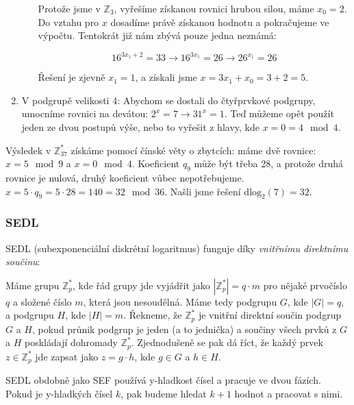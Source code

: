 \documentclass[10pt,a4paper]{article}
\begin{document}
\begin{exercise}
\begin{enumerate}
\begin{itemize}
Protože jsme v $\mathbb{Z}_{3}$, vyřešíme získanou rovnici hrubou silou, máme
$x_0 = 2$. Do vztahu pro $x$ dosadíme právě získanou hodnotu a pokračujeme ve
výpočtu. Tentokrát již nám zbývá pouze jedna neznámá:

$$ 16^{3x_1 + 2} = 33  \xrightarrow{} 16^{3x_1} = 26 \xrightarrow{} 26^{x_1} =
26$$

Řešení je zjevně $x_1 = 1$, a získali jsme $x = 3x_1 + x_0 = 3 + 2 = 5$.
\end{itemize}
\item V podgrupě velikosti 4: Abychom se dostali do čtyřprvkové podgrupy,
umocníme rovnici na devátou: $2^x = 7 \rightarrow{} 31^x = 1$. Teď můžeme opět
použít jeden ze dvou postupů výše, nebo to vyřešit z hlavy, kde $x = 0 = 4 \mod
4$.
\end{enumerate}

Výsledek v $\mathbb{Z}_{37}^*$ získáme pomocí čínské věty o zbytcích: máme dvě
rovnice: $x = 5 \mod 9$ a $x = 0 \mod 4$. Koeficient $q_9$ může být třeba 28, a
protože druhá rovnice je nulová, druhý koeficient vůbec nepotřebujeme. $x =
5\cdot q_9 = 5\cdot 28 = 140 = 32 \mod 36$. Našli jsme řešení $\text{dlog}_2(7)
= 32$.
\end{exercise}

\subsubsection{SEDL}
SEDL (subexponenciální diskrétní logaritmus) funguje díky \textit{vnitřnímu
direktnímu součinu}:

Máme grupu $\mathbb{Z}_p^*$, kde řád grupy jde vyjádřit jako $|\mathbb{Z}_p^*| =
q\cdot m$ pro nějaké prvočíslo $q$ a složené číslo $m$, která jsou nesoudělná.
Máme tedy podgrupu $G$, kde $|G| = q$, a podgrupu $H$, kde $|H| = m$. Řekneme,
že $\mathbb{Z}_p^*$ je vnitřní direktní součin podgrup $G$ a $H$, pokud průnik
podgrup je jeden (a to jednička) a součiny všech prvků z $G$ a $H$ poskládají
dohromady $\mathbb{Z}_p^*$. Zjednodušeně se pak dá říct, že každý prvek $z \in
\mathbb{Z}_p^*$ jde zapsat jako $z = g\cdot h$, kde $g \in G$ a $h \in H$.

SEDL obdobně jako SEF používá y-hladkost čísel a pracuje ve dvou fázích. Pokud
je y-hladkých čísel $k$, pak budeme hledat $k+1$ hodnot a pracovat s nimi. 
\end{document}
